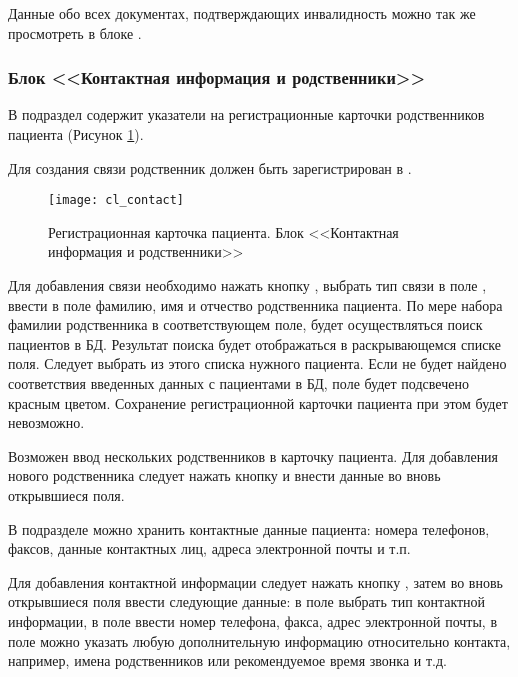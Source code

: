 \begin{prim}
Данные обо всех документах, подтверждающих инвалидность можно так же просмотреть в блоке .
\end{prim}
 
\subsubsection{Блок <<Контактная информация и родственники>>}

В подраздел  содержит указатели на регистрационные карточки родственников пациента (Рисунок \ref{img_cl_contact}). 

\begin{vnim}
Для создания связи родственник должен быть зарегистрирован в \tmis.
\end{vnim}

\begin{figure}[ht!]\centering
 \texttt{[image: cl\_contact]}
 \caption{Регистрационная карточка пациента. Блок <<Контактная информация и родственники>>}
 \label{img_cl_contact}
\end{figure} 

Для добавления связи необходимо нажать кнопку , выбрать тип связи в поле , ввести в поле  фамилию, имя и отчество родственника пациента. По мере набора фамилии родственника в соответствующем поле, будет осуществляться поиск пациентов в БД. Результат поиска будет отображаться в раскрывающемся списке поля. Следует выбрать из этого списка нужного пациента. Если не будет найдено соответствия введенных данных с пациентами в БД, поле  будет подсвечено красным цветом. Сохранение регистрационной карточки пациента при этом будет невозможно.

Возможен ввод нескольких родственников в карточку пациента. Для добавления нового родственника следует нажать кнопку  и внести данные во вновь открывшиеся поля.

В подразделе  можно хранить контактные данные пациента: номера телефонов, факсов, данные контактных лиц, адреса электронной почты и т.п.

Для добавления контактной информации следует нажать кнопку , затем во вновь открывшиеся поля ввести следующие данные: в поле  выбрать тип контактной информации, в поле  ввести номер телефона, факса, адрес электронной почты, в поле  можно указать любую дополнительную информацию относительно контакта, например, имена родственников или рекомендуемое время звонка и т.д.

